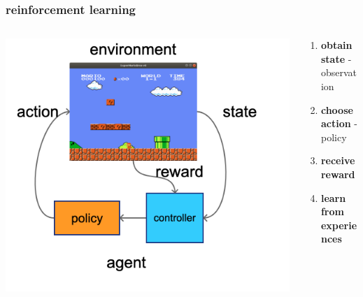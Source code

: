 \documentclass{beamer}
\begin{document}
\begin{frame}
\frametitle{reinforcement learning}

\begin{columns}

  \begin{column}{0.5\textwidth}
    \includegraphics[scale=0.15]{../diagrams/basic/reinforcementlearning.png}
  \end{column}

  \begin{column}{0.5\textwidth}
    \begin{enumerate}
      \item {\bf obtain state} - observation
      \item {\bf choose action} - policy
      \item {\bf receive reward}
      \item {\bf learn from experiences}
    \end{enumerate}
  \end{column}

\end{columns}

\end{frame}
\end{document}

